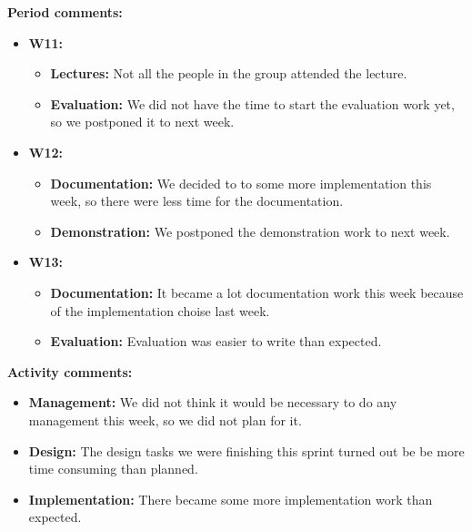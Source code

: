 \textbf{Period comments:}
\begin{itemize}
\item{}\textbf{W11:}
\begin{itemize}
\item{}\textbf{Lectures:} Not all the people in the group attended the lecture.
\item{}\textbf{Evaluation:} We did not have the time to start the evaluation work yet, so we postponed it to next week.
\end{itemize}
\item{}\textbf{W12:}
\begin{itemize}
\item{}\textbf{Documentation:} We decided to to some more implementation this week, so there were less time for the documentation.
\item{}\textbf{Demonstration:} We postponed the demonstration work to next week.
\end{itemize}

\newpage

\item{}\textbf{W13:}
\begin{itemize}
\item{}\textbf{Documentation:} It became a lot documentation work this week because of the implementation choise last week.
\item{}\textbf{Evaluation:} Evaluation was easier to write than expected.
\end{itemize}
\end{itemize}

\textbf{Activity comments:}
\begin{itemize}
\item{}\textbf{Management:} We did not think it would be necessary to do any management this week, so we did not plan for it.
\item{}\textbf{Design:} The design tasks we were finishing this sprint turned out be be more time consuming than planned.
\item{}\textbf{Implementation:} There became some more implementation work than expected.
\end{itemize}
